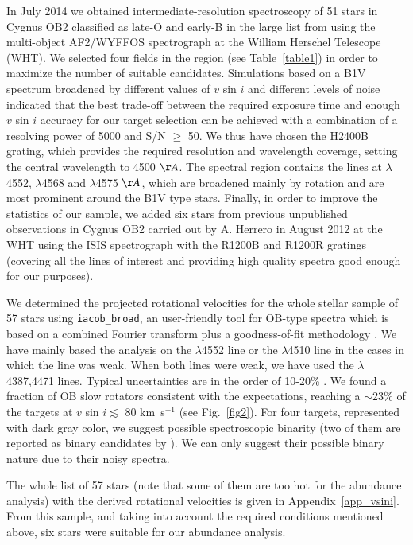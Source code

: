 \documentclass{aa} %
\begin{document}
In July 2014 we obtained intermediate-resolution spectroscopy of 51 stars in Cygnus OB2 classified as late-O and early-B in the large list from \cite{com12} using the multi-object AF2/WYFFOS spectrograph at the William Herschel Telescope (WHT). We selected four fields in the region (see Table~\ref{table1}) in order to maximize the number of suitable candidates. 
Simulations based on a B1V spectrum broadened by different values of $v$ sin $i$ and different levels of noise indicated that the best trade-off between the required exposure time and enough $v$ sin $i$ accuracy for our target selection can be achieved with a combination of a resolving power of 5000 and S/N $\geq$ 50. We thus have chosen the H2400B grating, which provides the required resolution and wavelength coverage, setting the central wavelength to 4500 $\AA$. 
The spectral region contains the  lines at  $\lambda$4552,  $\lambda$4568 and  $\lambda$4575 $\AA$, which are broadened mainly by rotation and are most prominent around the B1V type stars.
Finally, in order to improve the statistics of our sample, we added six stars from previous unpublished observations in Cygnus OB2 carried out by A. Herrero in August 2012 at the WHT using the ISIS spectrograph with the R1200B and R1200R gratings (covering all the lines of interest and providing high quality spectra good enough for our purposes).


 
We determined the projected rotational velocities for  the whole stellar sample of 57 stars using {\small{\texttt{iacob\_broad}}}, an user-friendly tool for OB-type spectra which is based on a combined Fourier transform plus a goodness-of-fit methodology \citep{ssimon07, ssimon14}. We have mainly based the analysis on the  $\lambda$4552 line or the  $\lambda$4510 line in the cases in which the  line was weak. When both lines were weak, we have used the  $\lambda$ 4387,4471 lines. Typical uncertainties are in the order of 10-20\% \citep{ssimon14}.
 We found a fraction of OB slow rotators consistent with the expectations, reaching a $\sim$23$\%$ of the targets at $v$ sin $i \lesssim$ 80 km~s$^{-1}$ (see Fig.~\ref{fig2}). For four targets, represented with dark gray color, we suggest possible spectroscopic binarity (two of them are reported as binary candidates by \cite{berlanas17}). We can only suggest their possible binary nature due to their noisy spectra. 
 
 The whole list of 57 stars (note that some of them are too hot for the abundance analysis) with the derived rotational velocities is given in Appendix~\ref{app_vsini}.
From this sample, and taking into account the required conditions mentioned above, six stars were suitable for our abundance analysis.
\end{document}
